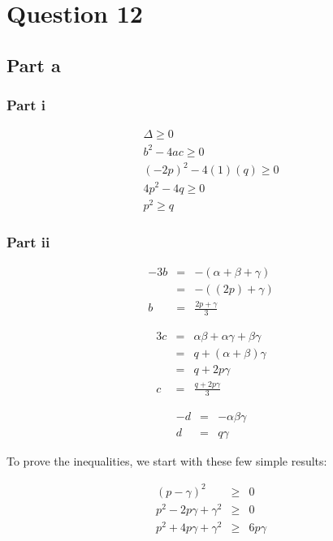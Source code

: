 \section*{Question 12}
\subsection*{Part a}
\subsubsection*{Part i}
\begin{eqnarray*}
  \Delta \ge 0 \\
  b^2 - 4ac \ge 0 \\
  (-2p)^2 - 4(1)(q) \ge 0 \\
  4p^2 - 4q \ge 0 \\
  p^2 \ge q
\end{eqnarray*}
\subsubsection*{Part ii}
\begin{eqnarray*}
    -3b &=& -(\alpha + \beta + \gamma) \\
        &=& -((2p) + \gamma) \\
      b &=& \frac{2p + \gamma}{3}
\end{eqnarray*}

\begin{eqnarray*}
    3c &=& \alpha\beta + \alpha\gamma + \beta\gamma \\
       &=& q + (\alpha + \beta)\gamma \\
       &=& q + 2p\gamma \\
     c &=& \frac{q + 2p\gamma}{3}
\end{eqnarray*}

\begin{eqnarray*}
    -d &=& -\alpha\beta\gamma \\
     d &=& q\gamma
\end{eqnarray*}

To prove the inequalities, we start with these few simple results:

\begin{eqnarray*}
  (p - \gamma)^2 &\ge& 0 \\
  p^2 - 2p\gamma + \gamma^2 &\ge& 0 \\
  p^2 + 4p\gamma + \gamma^2 &\ge& 6p\gamma \\
\end{eqnarray*}

